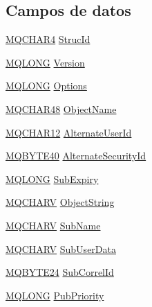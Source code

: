\subsection*{Campos de datos}
\begin{DoxyCompactItemize}
\item 
\hyperlink{cmqc_8h_a12590e546ed66fda7cf21c1d5cefa31d}{M\+Q\+C\+H\+A\+R4} \hyperlink{structtag_m_q_s_d_a0530922ca944569b52601d74941f96e4}{Struc\+Id}
\item 
\hyperlink{cmqc_8h_a1fb8d28cbda3fa8766a9821230cdb6d5}{M\+Q\+L\+O\+N\+G} \hyperlink{structtag_m_q_s_d_a0656ef8f766b3907d394d88a35d7b7e9}{Version}
\item 
\hyperlink{cmqc_8h_a1fb8d28cbda3fa8766a9821230cdb6d5}{M\+Q\+L\+O\+N\+G} \hyperlink{structtag_m_q_s_d_ad7aff2d6c6044809464380998d24ec5c}{Options}
\item 
\hyperlink{cmqc_8h_a53b1a2836da03f19144836725ff77919}{M\+Q\+C\+H\+A\+R48} \hyperlink{structtag_m_q_s_d_a2106fb125a9f7fc606340ba23c006bc0}{Object\+Name}
\item 
\hyperlink{cmqc_8h_a996cbcfd8d7ef4774f29b158a22d55c0}{M\+Q\+C\+H\+A\+R12} \hyperlink{structtag_m_q_s_d_aa4de0947b84fe1c303c8a5a419ef024a}{Alternate\+User\+Id}
\item 
\hyperlink{cmqc_8h_a1674aecfb9c9ab107699326ec31c4944}{M\+Q\+B\+Y\+T\+E40} \hyperlink{structtag_m_q_s_d_adc1f3b4aa3c6e3f3187e75291146cae7}{Alternate\+Security\+Id}
\item 
\hyperlink{cmqc_8h_a1fb8d28cbda3fa8766a9821230cdb6d5}{M\+Q\+L\+O\+N\+G} \hyperlink{structtag_m_q_s_d_a87aca8cd75818b045e3504060929eee5}{Sub\+Expiry}
\item 
\hyperlink{cmqc_8h_a2a61029e155515c1360dfc809dab6747}{M\+Q\+C\+H\+A\+R\+V} \hyperlink{structtag_m_q_s_d_a564791473371222ceb856cfaf02d6f91}{Object\+String}
\item 
\hyperlink{cmqc_8h_a2a61029e155515c1360dfc809dab6747}{M\+Q\+C\+H\+A\+R\+V} \hyperlink{structtag_m_q_s_d_a52ada97ac3869da3a2f04de08ed4c8d3}{Sub\+Name}
\item 
\hyperlink{cmqc_8h_a2a61029e155515c1360dfc809dab6747}{M\+Q\+C\+H\+A\+R\+V} \hyperlink{structtag_m_q_s_d_a90378e82138a08e732b9c34cc98479d1}{Sub\+User\+Data}
\item 
\hyperlink{cmqc_8h_a2866d93c0ef84cfcda34cab5fd22fc5a}{M\+Q\+B\+Y\+T\+E24} \hyperlink{structtag_m_q_s_d_a32dcf75a2ce80dd29ed6077b5683fbf5}{Sub\+Correl\+Id}
\item 
\hyperlink{cmqc_8h_a1fb8d28cbda3fa8766a9821230cdb6d5}{M\+Q\+L\+O\+N\+G} \hyperlink{structtag_m_q_s_d_a328df5a5108eba2a9bef42f51adb9a7c}{Pub\+Priority}

\end{DoxyCompactItemize}
